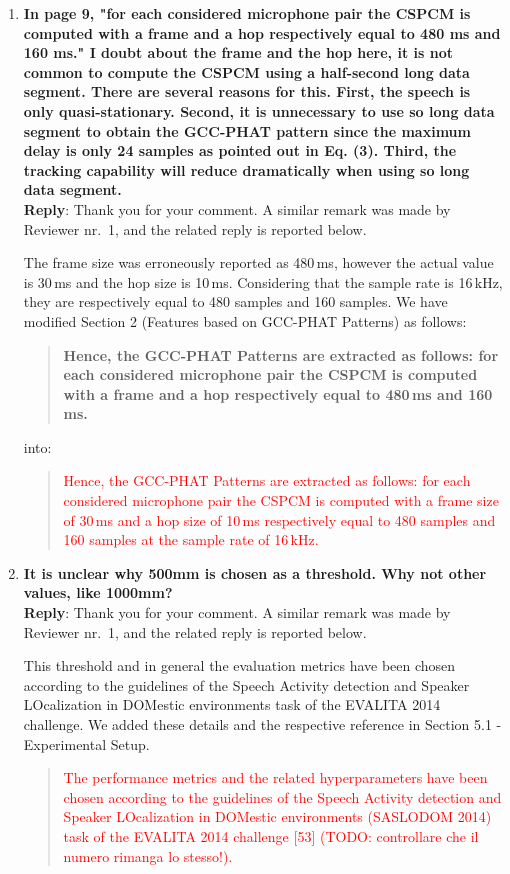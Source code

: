 \documentclass[11pt, technote, letterpaper, oneside, onecolumn]{IEEEtran}
\begin{document}
\begin{enumerate}
\item  \textbf{In page 9, "for each considered microphone pair the CSPCM is computed with a frame and a hop respectively equal to 480 ms and 160 ms." I doubt about the frame and the hop here, it is not common to compute the CSPCM using a half-second long data segment. There are several reasons for this. First, the speech is only quasi-stationary. Second, it is unnecessary to use so long data segment to obtain the GCC-PHAT pattern since the maximum delay is only 24 samples as pointed out in Eq. (3). Third, the tracking capability will reduce dramatically when using so long data segment.\\}
\textbf{Reply}: Thank you for your comment. A similar remark was made by Reviewer nr.\ 1, and the related reply is reported below.

The frame size was erroneously reported as 480\,ms, however the actual value is 30\,ms and the hop size is 10\,ms. Considering that the sample rate is 16\,kHz, they are respectively equal to 480 samples and 160 samples. We have modified Section 2 (Features based on GCC-PHAT Patterns) as follows:

\begin{quote}
	\textbf{Hence, the GCC-PHAT Patterns are extracted as follows: for each considered microphone pair the CSPCM is computed with a frame and a hop respectively equal to 480\,ms and 160\,ms.}
\end{quote}
into:
\begin{quote}
	\textcolor{red}{Hence, the GCC-PHAT Patterns are extracted as follows: for each considered microphone pair the CSPCM is computed with a frame size of 30\,ms and a hop size of 10\,ms respectively equal to 480 samples and 160 samples at the sample rate of 16\,kHz.}
\end{quote}


\item  \textbf{It is unclear why 500mm is chosen as a threshold. Why not other values, like 1000mm?\\}
\textbf{Reply}: Thank you for your comment.  A similar remark was made by Reviewer nr.\ 1, and the related reply is reported below.

This threshold and in general the evaluation metrics have been chosen according to the guidelines of the Speech Activity detection and Speaker LOcalization in DOMestic environments task of the EVALITA 2014 challenge. We added these details and the respective reference in Section 5.1 - Experimental Setup.
\begin{quote}
	\textcolor{red}{The performance metrics and the related hyperparameters have been chosen according to the guidelines of the Speech Activity detection and Speaker LOcalization in DOMestic environments (SASLODOM 2014) task of the EVALITA 2014 challenge [53] (TODO: controllare che il numero rimanga lo stesso!).}
\end{quote}


\end{enumerate}
\end{document}
